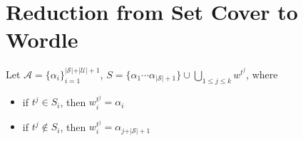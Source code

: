 \documentclass[10pt,a4paper]{article}
\begin{document}
\section{Reduction from Set Cover to Wordle}
Let $\mathcal{A}=\{\alpha_{i}\}^{\vert\mathcal{S}\vert+\vert \mathcal{U}\vert+1}_{i=1}$, $S= \{\alpha_1\cdots\alpha_{\vert\mathcal{S}\vert+1}\} \cup \bigcup_{1\leq j\leq k} w^{t^j}$, where 
\begin{itemize}
\item if $t^j\in S_i$, then $w^{t^j}_i = \alpha_i$  
\item if $t^j\not  \in S_i $, then $w^{t^j}_i=\alpha_{j+\vert\mathcal{S}\vert+1}$ 
\end{itemize}
\end{document}
